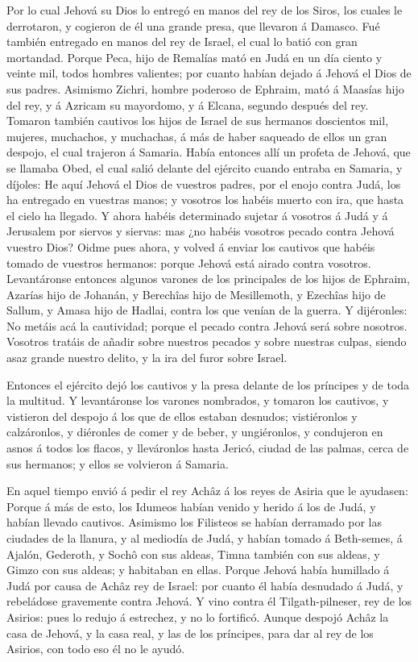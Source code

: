  Por lo cual Jehová su Dios lo entregó en manos del rey de
los Siros, los cuales le derrotaron, y cogieron de él una grande presa,
que llevaron á Damasco. Fué también entregado en manos del rey de
Israel, el cual lo batió con gran mortandad.  Porque Peca,
hijo de Remalías mató en Judá en un día ciento y veinte mil, todos
hombres valientes; por cuanto habían dejado á Jehová el Dios de sus
padres.  Asimismo Zichri, hombre poderoso de Ephraim, mató á
Maasías hijo del rey, y á Azricam su mayordomo, y á Elcana, segundo
después del rey.  Tomaron también cautivos los hijos de
Israel de sus hermanos doscientos mil, mujeres, muchachos, y muchachas,
á más de haber saqueado de ellos un gran despojo, el cual trajeron á
Samaria.  Había entonces allí un profeta de Jehová, que se
llamaba Obed, el cual salió delante del ejército cuando entraba en
Samaria, y díjoles: He aquí Jehová el Dios de vuestros padres, por el
enojo contra Judá, los ha entregado en vuestras manos; y vosotros los
habéis muerto con ira, que hasta el cielo ha llegado.  Y
ahora habéis determinado sujetar á vosotros á Judá y á Jerusalem por
siervos y siervas: mas ¿no habéis vosotros pecado contra Jehová vuestro
Dios?  Oidme pues ahora, y volved á enviar los cautivos que
habéis tomado de vuestros hermanos: porque Jehová está airado contra
vosotros.  Levantáronse entonces algunos varones de los
principales de los hijos de Ephraim, Azarías hijo de Johanán, y
Berechîas hijo de Mesillemoth, y Ezechîas hijo de Sallum, y Amasa hijo
de Hadlai, contra los que venían de la guerra.  Y
dijéronles: No metáis acá la cautividad; porque el pecado contra Jehová
será sobre nosotros. Vosotros tratáis de añadir sobre nuestros pecados y
sobre nuestras culpas, siendo asaz grande nuestro delito, y la ira del
furor sobre Israel.

 Entonces el ejército dejó los cautivos y la presa delante
de los príncipes y de toda la multitud.  Y levantáronse los
varones nombrados, y tomaron los cautivos, y vistieron del despojo á los
que de ellos estaban desnudos; vistiéronlos y calzáronlos, y diéronles
de comer y de beber, y ungiéronlos, y condujeron en asnos á todos los
flacos, y lleváronlos hasta Jericó, ciudad de las palmas, cerca de sus
hermanos; y ellos se volvieron á Samaria.

 En aquel tiempo envió á pedir el rey Achâz á los reyes de
Asiria que le ayudasen:  Porque á más de esto, los Idumeos
habían venido y herido á los de Judá, y habían llevado cautivos.
 Asimismo los Filisteos se habían derramado por las
ciudades de la llanura, y al mediodía de Judá, y habían tomado á
Beth-semes, á Ajalón, Gederoth, y Sochô con sus aldeas, Timna también
con sus aldeas, y Gimzo con sus aldeas; y habitaban en ellas.
 Porque Jehová había humillado á Judá por causa de Achâz
rey de Israel: por cuanto él había desnudado á Judá, y rebeládose
gravemente contra Jehová.  Y vino contra él
Tilgath-pilneser, rey de los Asirios: pues lo redujo á estrechez, y no
lo fortificó.  Aunque despojó Achâz la casa de Jehová, y la
casa real, y las de los príncipes, para dar al rey de los Asirios, con
todo eso él no le ayudó.

